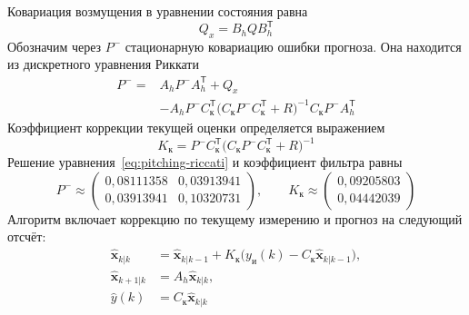 Ковариация возмущения в уравнении состояния равна
\begin{equation}
  Q_x=B_hQB_h^{\mathsf T}
  \label{eq:pitching-state-covariance}
\end{equation}
Обозначим через $P^-$ стационарную ковариацию ошибки прогноза.
Она находится из дискретного уравнения Риккати
\begin{equation}
  \begin{aligned}
    P^-={}&A_hP^-A_h^{\mathsf T}+Q_x\\
      &-A_hP^-C_{\text{к}}^{\mathsf T}
        \bigl(C_{\text{к}}P^-C_{\text{к}}^{\mathsf T}+R\bigr)^{-1}
        C_{\text{к}}P^-A_h^{\mathsf T}
  \end{aligned}
  \label{eq:pitching-riccati}
\end{equation}
Коэффициент коррекции текущей оценки определяется выражением
\begin{equation}
  K_{\text{к}}=P^-C_{\text{к}}^{\mathsf T}
    \bigl(C_{\text{к}}P^-C_{\text{к}}^{\mathsf T}+R\bigr)^{-1}
  \label{eq:pitching-kalman-gain}
\end{equation}
Решение уравнения~\eqref{eq:pitching-riccati} и коэффициент фильтра равны
\begin{equation}
  P^-\approx\begin{pmatrix}
    0{,}08111358&0{,}03913941\\
    0{,}03913941&0{,}10320731
  \end{pmatrix},
  \qquad
  K_{\text{к}}\approx\begin{pmatrix}0{,}09205803\\0{,}04442039\end{pmatrix}
  \label{eq:pitching-kalman-numeric}
\end{equation}
Алгоритм включает коррекцию по текущему измерению и прогноз
на следующий отсчёт:
\begin{equation}
  \begin{aligned}
    \hat{\bm x}_{k|k}
      &=\hat{\bm x}_{k|k-1}
        +K_{\text{к}}\bigl(y_{\text{и}}(k)-C_{\text{к}}\hat{\bm x}_{k|k-1}\bigr),\\
    \hat{\bm x}_{k+1|k}&=A_h\hat{\bm x}_{k|k},\\
    \hat y(k)&=C_{\text{к}}\hat{\bm x}_{k|k}
  \end{aligned}
  \label{eq:pitching-kalman-algorithm}
\end{equation}

